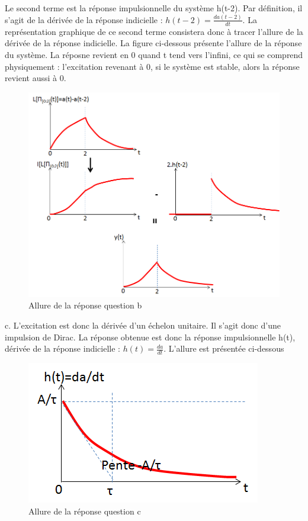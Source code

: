\documentclass[11pt]{report}
\begin{document}
	Le second terme est la réponse impulsionnelle du système h(t-2). Par définition, il s'agit de la dérivée de la réponse indicielle : $h(t-2)=\frac{da(t-2)}{dt}$. La représentation graphique de ce second terme consistera donc à tracer l'allure de la dérivée de la réponse indicielle. La figure ci-dessous présente l'allure de la réponse du système. La réposne revient en 0 quand t tend vers l'infini, ce qui se comprend physiquement : l'excitation revenant à 0, si le système est stable, alors la réponse revient aussi à 0. 
	\begin{figure}[h!]
		\centering
		\includegraphics[scale=0.55]{images/allure_exo_2_3_b.png} 
		\caption{Allure de la réponse question b}
	\end{figure}
	
 	
 	c. L'excitation est donc la dérivée d'un échelon unitaire. Il s'agit donc d'une impulsion de Dirac. La réponse obtenue est donc la réponse impulsionnelle h(t), dérivée de la réponse indicielle : $h(t)=\frac{da}{dt}$. L'allure est présentée ci-dessous\\
 	\begin{figure}[h!]
 		\centering
 		\includegraphics[scale=0.55]{images/allure_exo_2_3_c.png} 
 		\caption{Allure de la réponse question c}
 	\end{figure}
 	
\end{document}
